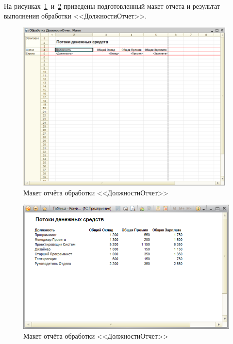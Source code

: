 \pagebreak

На рисунках~\ref{fig:positions_report_template}~и~\ref{fig:positions_report_results}
приведены подготовленный макет отчета и результат выполнения обработки <<ДолжностиОтчет>>.
\begin{figure}[h!]
  \centering
  \includegraphics[width=110mm]{pic/positions_report_template}
  \caption{Макет отчёта обработки <<ДолжностиОтчет>>}
  \label{fig:positions_report_template}
\end{figure}
\begin{figure}[h!]
  \centering
  \includegraphics[width=140mm]{pic/positions_report_results}
  \caption{Макет отчёта обработки <<ДолжностиОтчет>>}
  \label{fig:positions_report_results}
\end{figure}

